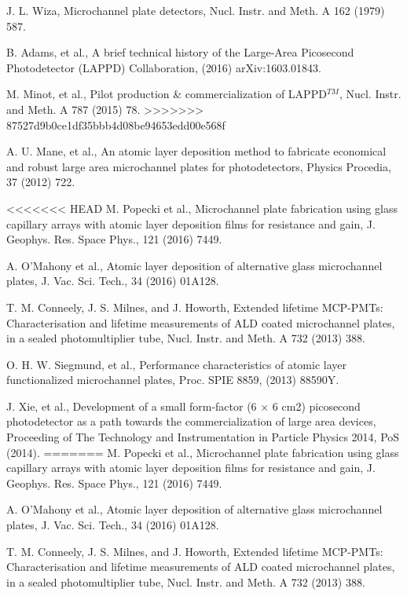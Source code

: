 ﻿\documentclass[preprint,5p]{elsarticle}
\begin{document}
\begin{thebibliography}{00}
J. L. Wiza, Microchannel plate detectors, Nucl. Instr. and Meth. A 162 (1979) 587.

B. Adams, et al., A brief technical history of the Large-Area Picosecond Photodetector (LAPPD) Collaboration, (2016) arXiv:1603.01843.

M. Minot, et al., Pilot production \& commercialization of LAPPD$^{𝑇𝑀}$, 
      Nucl.  Instr. and Meth. A 787 (2015) 78.
>>>>>>> 87527d9b0ce1df35bbb4d08be94653edd00e568f

A. U. Mane, et al., An atomic layer deposition method to fabricate economical and robust large area microchannel plates for photodetectors, Physics Procedia, 37 (2012) 722.

<<<<<<< HEAD
M. Popecki et al., Microchannel plate fabrication using glass capillary arrays 
      with atomic layer deposition films for resistance and gain, J.  Geophys.  
      Res. Space Phys., 121 (2016) 7449.

A. O'Mahony et al., Atomic layer deposition of alternative glass microchannel 
      plates, J. Vac. Sci. Tech., 34 (2016) 01A128.

T. M. Conneely, J. S. Milnes, and J. Howorth, Extended lifetime MCP-PMTs: 
      Characterisation and lifetime measurements of ALD coated microchannel 
      plates, in a sealed photomultiplier tube, Nucl. Instr. and Meth. A 732 
      (2013) 388.

O. H. W. Siegmund, et al., Performance characteristics of atomic layer 
      functionalized microchannel plates, Proc. SPIE 8859, (2013) 88590Y.

J. Xie, et al., Development of a small form-factor (6 × 6 cm2) picosecond 
photodetector as a path towards the commercialization of large area devices, 
Proceeding of The Technology and Instrumentation in Particle Physics 2014, PoS 
(2014).
=======
M. Popecki et al., Microchannel plate fabrication using glass capillary arrays with atomic layer deposition films for resistance and gain, J. Geophys. Res. Space Phys., 121 (2016) 7449.

A. O'Mahony et al., Atomic layer deposition of alternative glass microchannel plates, J. Vac. Sci. Tech., 34 (2016) 01A128.

T. M. Conneely, J. S. Milnes, and J. Howorth, Extended lifetime MCP-PMTs: Characterisation and lifetime measurements of ALD coated microchannel plates, in a sealed photomultiplier tube, Nucl. Instr. and Meth. A 732 (2013) 388.


\end{thebibliography}
\end{document}

